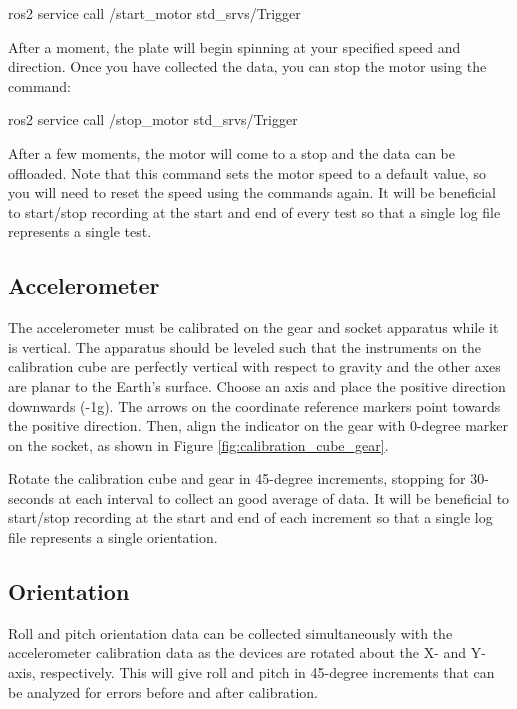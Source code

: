 \begin{bash}
    ros2 service call /start_motor std_srvs/Trigger
\end{bash}

\noindent After a moment, the plate will begin spinning at your specified speed and direction.
Once you have collected the data, you can stop the motor using the command:

\begin{bash}
    ros2 service call /stop_motor std_srvs/Trigger
\end{bash}

\noindent After a few moments, the motor will come to a stop and the data can be offloaded.
Note that this command sets the motor speed to a default value, so you will need to reset the speed using the commands again.
It will be beneficial to start/stop recording at the start and end of every test so that a single log file represents a single test.

\subsection{Accelerometer} \label{ssec:calibration_accelerometer}
The accelerometer must be calibrated on the gear and socket apparatus while it is vertical.
The apparatus should be leveled such that the instruments on the calibration cube are perfectly vertical with respect to gravity and the other axes are planar to the Earth's surface.
Choose an axis and place the positive direction downwards (-1g).
The arrows on the coordinate reference markers point towards the positive direction.
Then, align the indicator on the gear with 0-degree marker on the socket, as shown in Figure \ref{fig:calibration_cube_gear}.

Rotate the calibration cube and gear in 45-degree increments, stopping for 30-seconds at each interval to collect an good average of data.
It will be beneficial to start/stop recording at the start and end of each increment so that a single log file represents a single orientation.

\subsection{Orientation} \label{ssec:calibration_orientation}
Roll and pitch orientation data can be collected simultaneously with the accelerometer calibration data as the devices are rotated about the X- and Y-axis, respectively.
This will give roll and pitch in 45-degree increments that can be analyzed for errors before and after calibration.

